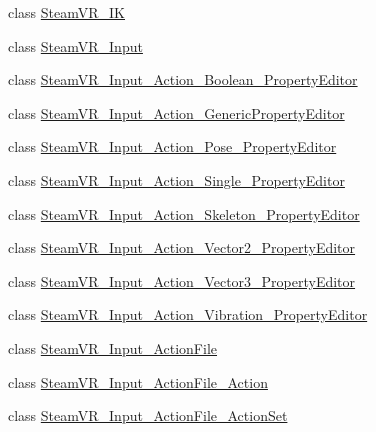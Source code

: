 \begin{DoxyCompactItemize}
\item 
class \mbox{\hyperlink{class_valve_1_1_v_r_1_1_steam_v_r___i_k}{Steam\+V\+R\+\_\+\+IK}}
\item 
class \mbox{\hyperlink{class_valve_1_1_v_r_1_1_steam_v_r___input}{Steam\+V\+R\+\_\+\+Input}}
\item 
class \mbox{\hyperlink{class_valve_1_1_v_r_1_1_steam_v_r___input___action___boolean___property_editor}{Steam\+V\+R\+\_\+\+Input\+\_\+\+Action\+\_\+\+Boolean\+\_\+\+Property\+Editor}}
\item 
class \mbox{\hyperlink{class_valve_1_1_v_r_1_1_steam_v_r___input___action___generic_property_editor}{Steam\+V\+R\+\_\+\+Input\+\_\+\+Action\+\_\+\+Generic\+Property\+Editor}}
\item 
class \mbox{\hyperlink{class_valve_1_1_v_r_1_1_steam_v_r___input___action___pose___property_editor}{Steam\+V\+R\+\_\+\+Input\+\_\+\+Action\+\_\+\+Pose\+\_\+\+Property\+Editor}}
\item 
class \mbox{\hyperlink{class_valve_1_1_v_r_1_1_steam_v_r___input___action___single___property_editor}{Steam\+V\+R\+\_\+\+Input\+\_\+\+Action\+\_\+\+Single\+\_\+\+Property\+Editor}}
\item 
class \mbox{\hyperlink{class_valve_1_1_v_r_1_1_steam_v_r___input___action___skeleton___property_editor}{Steam\+V\+R\+\_\+\+Input\+\_\+\+Action\+\_\+\+Skeleton\+\_\+\+Property\+Editor}}
\item 
class \mbox{\hyperlink{class_valve_1_1_v_r_1_1_steam_v_r___input___action___vector2___property_editor}{Steam\+V\+R\+\_\+\+Input\+\_\+\+Action\+\_\+\+Vector2\+\_\+\+Property\+Editor}}
\item 
class \mbox{\hyperlink{class_valve_1_1_v_r_1_1_steam_v_r___input___action___vector3___property_editor}{Steam\+V\+R\+\_\+\+Input\+\_\+\+Action\+\_\+\+Vector3\+\_\+\+Property\+Editor}}
\item 
class \mbox{\hyperlink{class_valve_1_1_v_r_1_1_steam_v_r___input___action___vibration___property_editor}{Steam\+V\+R\+\_\+\+Input\+\_\+\+Action\+\_\+\+Vibration\+\_\+\+Property\+Editor}}
\item 
class \mbox{\hyperlink{class_valve_1_1_v_r_1_1_steam_v_r___input___action_file}{Steam\+V\+R\+\_\+\+Input\+\_\+\+Action\+File}}
\item 
class \mbox{\hyperlink{class_valve_1_1_v_r_1_1_steam_v_r___input___action_file___action}{Steam\+V\+R\+\_\+\+Input\+\_\+\+Action\+File\+\_\+\+Action}}
\item 
class \mbox{\hyperlink{class_valve_1_1_v_r_1_1_steam_v_r___input___action_file___action_set}{Steam\+V\+R\+\_\+\+Input\+\_\+\+Action\+File\+\_\+\+Action\+Set}}

\end{DoxyCompactItemize}
